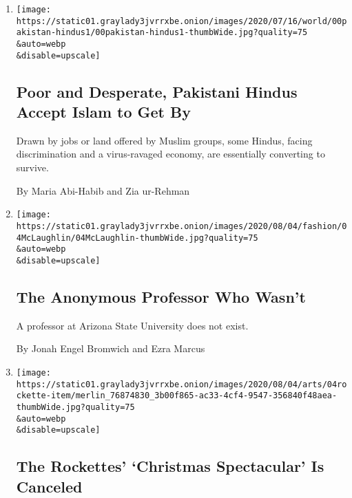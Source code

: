 \begin{enumerate}
\def\labelenumi{\arabic{enumi}.}
\item
  \href{/2020/08/04/world/asia/pakistan-hindu-conversion.html}{}

  \texttt{[image: https://static01.graylady3jvrrxbe.onion/images/2020/07/16/world/00pakistan-hindus1/00pakistan-hindus1-thumbWide.jpg?quality=75\\\&auto=webp\\\&disable=upscale]}

  \hypertarget{poor-and-desperate-pakistani-hindus-accept-islam-to-get-by}{%
  \subsection{Poor and Desperate, Pakistani Hindus Accept Islam to Get
  By}\label{poor-and-desperate-pakistani-hindus-accept-islam-to-get-by}}

  Drawn by jobs or land offered by Muslim groups, some Hindus, facing
  discrimination and a virus-ravaged economy, are essentially converting
  to survive.

  By Maria Abi-Habib and Zia ur-Rehman
\item
  \href{/2020/08/04/style/college-coronavirus-hoax.html}{}

  \texttt{[image: https://static01.graylady3jvrrxbe.onion/images/2020/08/04/fashion/04McLaughlin/04McLaughlin-thumbWide.jpg?quality=75\\\&auto=webp\\\&disable=upscale]}

  \hypertarget{the-anonymous-professor-who-wasnt}{%
  \subsection{The Anonymous Professor Who
  Wasn't}\label{the-anonymous-professor-who-wasnt}}

  A professor at Arizona State University does not exist.

  By Jonah Engel Bromwich and Ezra Marcus
\item
  \href{/2020/08/04/theater/radio-city-rockettes-christmas-canceled.html}{}

  \texttt{[image: https://static01.graylady3jvrrxbe.onion/images/2020/08/04/arts/04rockette-item/merlin\_76874830\_3b00f865-ac33-4cf4-9547-356840f48aea-thumbWide.jpg?quality=75\\\&auto=webp\\\&disable=upscale]}

  \hypertarget{the-rockettes-christmas-spectacular-is-canceled}{%
  \subsection{The Rockettes' `Christmas Spectacular' Is
  Canceled}\label{the-rockettes-christmas-spectacular-is-canceled}}


\end{enumerate}
